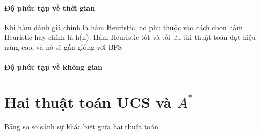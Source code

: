 \documentclass{article}
\begin{document}
\paragraph{Độ phức tạp về thời gian}
Khi hàm đánh giá chính là hàm Heuristic, nó phụ thuộc vào cách chọn hàm Heuristic hay chính là h(n). Hàm Heuristic tốt và tối ưu thì thuật toán đạt hiệu năng cao, và nó sẽ gần giống với BFS
\paragraph{Độ phức tạp về không gian}

\newpage

\section{Hai thuật toán UCS và $A^{*}$}
Bảng so so sánh sự khác biệt giữa hai thuật toán
\end{document}
